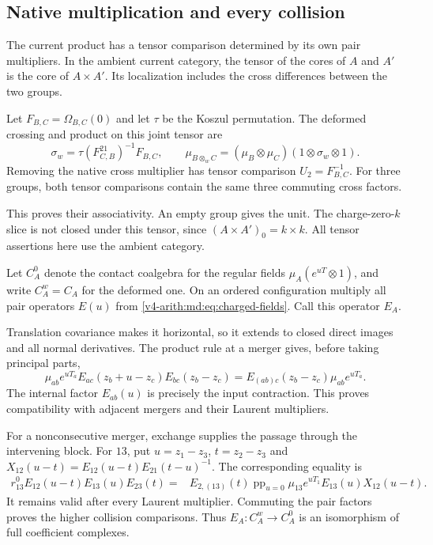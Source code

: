 \subsection{Native multiplication and every collision}

The current product has a tensor comparison determined
by its own pair multipliers. In the ambient current
category, the tensor of the cores of $A$ and $A'$ is
the core of $A\times A'$. Its localization includes
the cross differences between the two groups.

Let $F_{B,C}=\Omega_{B,C}(0)$ and let $\tau$ be the
Koszul permutation. The deformed crossing and product
on this joint tensor are
\[
 \sigma_w=\tau(F_{C,B}^{21})^{-1}F_{B,C},\qquad
 \mu_{B\otimes_wC}=(\mu_B\otimes\mu_C)
                         (1\otimes\sigma_w\otimes1).
\]
Removing the native cross multiplier has tensor
comparison $U_2=F_{B,C}^{-1}$.
For three groups, both tensor comparisons contain
the same three commuting cross factors.

This proves
their associativity. An empty group gives the unit.
The charge-zero-$k$ slice is not closed under this
tensor, since $(A\times A')_0=k\times k$.
All tensor assertions here use the ambient category.

Let $C_A^0$ denote the contact coalgebra for the
regular fields $\mu_A(e^{uT}\otimes1)$, and write
$C_A^w=C_A$ for the deformed one. On an ordered
configuration multiply all pair operators $E(u)$
from \eqref{v4-arith:md:eq:charged-fields}.
Call this operator $E_A$.

Translation covariance
makes it horizontal, so it extends to closed direct
images and all normal derivatives. The product rule
at a merger gives, before taking principal parts,
\[
 \mu_{ab}e^{uT_a}
 E_{ac}(z_b+u-z_c)E_{bc}(z_b-z_c)
 =E_{(ab)c}(z_b-z_c)\mu_{ab}e^{uT_a}.
\]
The internal factor $E_{ab}(u)$ is precisely the
input contraction. This proves compatibility with
adjacent mergers and their Laurent multipliers.

For a nonconsecutive merger, exchange supplies the
passage through the intervening block. For $13$,
put $u=z_1-z_3$, $t=z_2-z_3$ and
$X_{12}(u-t)=E_{12}(u-t)E_{21}(t-u)^{-1}$.
The corresponding equality is
\begin{align*}
 r^0_{13}E_{12}(u-t)E_{13}(u)E_{23}(t)
 ={}&E_{2,(13)}(t)\operatorname{pp}_{u=0}
       \mu_{13}e^{uT_1}E_{13}(u)X_{12}(u-t).
\end{align*}
It remains valid after every Laurent multiplier.
Commuting the pair factors proves the higher
collision comparisons. Thus $E_A:C_A^w\to C_A^0$
is an isomorphism of full coefficient complexes.

